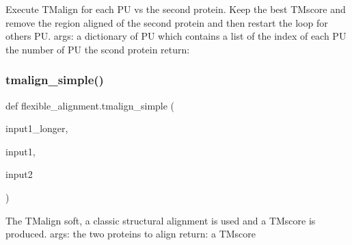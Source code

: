 \begin{DoxyVerb}Execute TMalign for each PU vs the second protein. Keep the best TMscore
and remove the region aligned of the second protein and then restart the
loop for others PU.
args:
    a dictionary of PU which contains a list of the index of each PU
    the number of PU
    the scond protein
return:\end{DoxyVerb}
 \mbox{\label{namespaceflexible__alignment_ab55bda24cab9e03ff78dda73b13afbf9}} 
\subsubsection{\texorpdfstring{tmalign\+\_\+simple()}{tmalign\_simple()}}
{\footnotesize\ttfamily def flexible\+\_\+alignment.\+tmalign\+\_\+simple (\begin{DoxyParamCaption}\item[{}]{input1\+\_\+longer,  }\item[{}]{input1,  }\item[{}]{input2 }\end{DoxyParamCaption})}

\begin{DoxyVerb}The TMalign soft, a classic structural alignment is used and a TMscore is
produced.
args:
    the two proteins to align
return:
    a TMscore
\end{DoxyVerb}
 